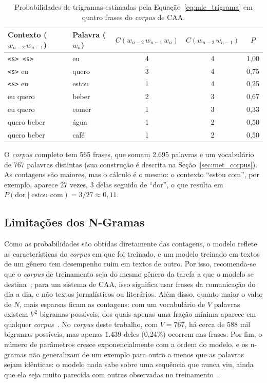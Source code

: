 \begin{table}[htbp]
    \centering
    \caption{Probabilidades de trigramas estimadas pela Equação~\ref{eq:mle_trigrama} em quatro frases do \textit{corpus} de \gls{CAA}.}
    \label{tab:trigramas}
    \begin{tabular}{llccc}
        \hline
        Contexto ($w_{n-2}\,w_{n-1}$) & Palavra ($w_n$) & $C(w_{n-2}\,w_{n-1}\,w_n)$ & $C(w_{n-2}\,w_{n-1})$ & $P$ \\
        \hline
        \texttt{<s> <s>} & eu & 4 & 4 & 1,00 \\
        \texttt{<s>} eu & quero & 3 & 4 & 0,75 \\
        \texttt{<s>} eu & estou & 1 & 4 & 0,25 \\
        eu quero & beber & 2 & 3 & 0,67 \\
        eu quero & comer & 1 & 3 & 0,33 \\
        quero beber & água & 1 & 2 & 0,50 \\
        quero beber & café & 1 & 2 & 0,50 \\
        \hline
    \end{tabular}
\end{table}

O \textit{corpus} completo tem 565 frases, que somam 2.695 palavras e um vocabulário de 767 palavras distintas (sua construção é descrita na Seção~\ref{sec:met_corpus}). As contagens são maiores, mas o cálculo é o mesmo: o contexto ``estou com'', por exemplo, aparece 27 vezes, 3 delas seguido de ``dor'', o que resulta em $P(\textrm{dor} \mid \textrm{estou com}) = 3/27 \approx 0{,}11$.

\subsection{Limitações dos N-Gramas} \label{sec:limitacoes_ngramas}

Como as probabilidades são obtidas diretamente das contagens, o modelo reflete as características do \textit{corpus} em que foi treinado, e um modelo treinado em textos de um gênero tem desempenho ruim em textos de outro. Por isso, recomenda-se que o \textit{corpus} de treinamento seja do mesmo gênero da tarefa a que o modelo se destina~\cite[cap.~3]{jurafsky2026slp}; para um sistema de \gls{CAA}, isso significa usar frases da comunicação do dia a dia, e não textos jornalísticos ou literários. Além disso, quanto maior o valor de $N$, mais esparsas ficam as contagens: com um vocabulário de $V$ palavras existem $V^2$ bigramas possíveis, dos quais apenas uma fração mínima aparece em qualquer \textit{corpus}~\cite[cap.~3]{jurafsky2026slp}. No \textit{corpus} deste trabalho, com $V = 767$, há cerca de 588 mil bigramas possíveis, mas apenas 1.439 deles (0,24\%) ocorrem nas frases. Por fim, o número de parâmetros cresce exponencialmente com a ordem do modelo, e os n-gramas não generalizam de um exemplo para outro a menos que as palavras sejam idênticas: o modelo nada sabe sobre uma sequência que nunca viu, ainda que ela seja muito parecida com outras observadas no treinamento~\cite[cap.~3]{jurafsky2026slp}.

